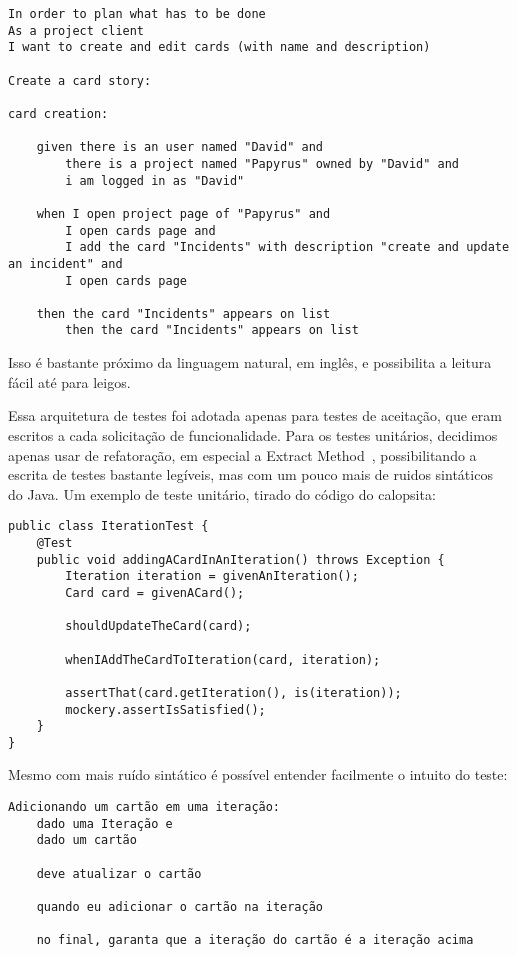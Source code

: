 \begin{verbatim}
In order to plan what has to be done
As a project client
I want to create and edit cards (with name and description)

Create a card story:

card creation:
	
	given there is an user named "David" and
		there is a project named "Papyrus" owned by "David" and
		i am logged in as "David"

	when I open project page of "Papyrus" and
		I open cards page and
		I add the card "Incidents" with description "create and update an incident" and
		I open cards page
			
	then the card "Incidents" appears on list
		then the card "Incidents" appears on list
\end{verbatim}

Isso é bastante próximo da linguagem natural, em inglês, e possibilita a leitura fácil até para leigos.

Essa arquitetura de testes foi adotada apenas para testes de aceitação, que eram escritos a cada solicitação de
funcionalidade. Para os testes unitários, decidimos apenas usar de refatoração, em especial a Extract Method~\cite{refactoring}, possibilitando a escrita de testes bastante
legíveis, mas com um pouco mais de ruidos sintáticos do Java. Um exemplo de teste unitário, tirado do código do calopsita:

\begin{lstlisting}
public class IterationTest {
	@Test
	public void addingACardInAnIteration() throws Exception {
		Iteration iteration = givenAnIteration();
		Card card = givenACard();

		shouldUpdateTheCard(card);

		whenIAddTheCardToIteration(card, iteration);

		assertThat(card.getIteration(), is(iteration));
		mockery.assertIsSatisfied();
	}
}
\end{lstlisting}

Mesmo com mais ruído sintático é possível entender facilmente o intuito do teste:

\begin{verbatim}
Adicionando um cartão em uma iteração:
	dado uma Iteração e
	dado um cartão
  
	deve atualizar o cartão
  
	quando eu adicionar o cartão na iteração
  
	no final, garanta que a iteração do cartão é a iteração acima
\end{verbatim}

